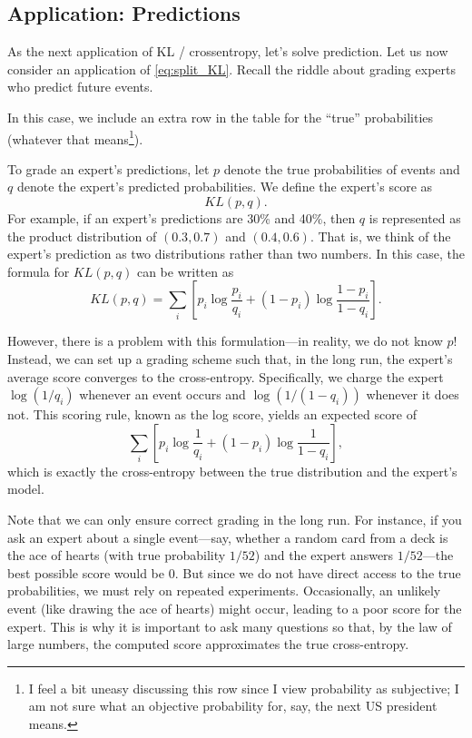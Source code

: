 \documentclass{article}
\begin{document}
\subsection{Application: Predictions}

As the next application of KL / crossentropy, let's solve prediction. Let us now consider an application of \cref{eq:split_KL}. Recall the riddle about grading experts who predict future events.


In this case, we include an extra row in the table for the ``true'' probabilities (whatever that means\footnote{I feel a bit uneasy discussing this row since I view probability as subjective; I am not sure what an objective probability for, say, the next US president means.}). 

To grade an expert's predictions, let \(p\) denote the true probabilities of events and \(q\) denote the expert's predicted probabilities. We define the expert's score as
\[
KL(p,q).
\]
For example, if an expert's predictions are 30\% and 40\%, then \(q\) is represented as the product distribution of \((0.3,0.7)\) and \((0.4,0.6)\). That is, we think of the expert's prediction as two distributions rather than two numbers. In this case, the formula for \(KL(p,q)\) can be written as
\[
KL(p,q) = \sum_i \left[p_i\log\frac{p_i}{q_i} + (1-p_i)\log\frac{1-p_i}{1-q_i}\right].
\]

However, there is a problem with this formulation—in reality, we do not know \(p\)! Instead, we can set up a grading scheme such that, in the long run, the expert's average score converges to the cross-entropy. Specifically, we charge the expert \(\log(1/q_i)\) whenever an event occurs and \(\log(1/(1-q_i))\) whenever it does not. This scoring rule, known as the log score, yields an expected score of
\[
\sum_i \left[p_i\log\frac{1}{q_i} + (1-p_i)\log\frac{1}{1-q_i}\right],
\]
which is exactly the cross-entropy between the true distribution and the expert's model.

Note that we can only ensure correct grading in the long run. For instance, if you ask an expert about a single event—say, whether a random card from a deck is the ace of hearts (with true probability \(1/52\)) and the expert answers \(1/52\)—the best possible score would be 0. But since we do not have direct access to the true probabilities, we must rely on repeated experiments. Occasionally, an unlikely event (like drawing the ace of hearts) might occur, leading to a poor score for the expert. This is why it is important to ask many questions so that, by the law of large numbers, the computed score approximates the true cross-entropy.
\end{document}
